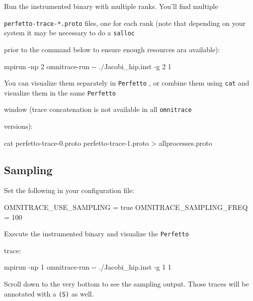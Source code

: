 \documentclass[
]{article}
\let\oldtexttt\texttt
\renewcommand{\texttt}[1]{
  \colorbox{Light}{\oldtexttt{#1}}
}
\newenvironment{Shaded}{}{}
\newcommand{\ExtensionTok}[1]{#1}
\newcommand{\FunctionTok}[1]{\textcolor[rgb]{0.02,0.16,0.49}{#1}}
\newcommand{\NormalTok}[1]{#1}
\newcommand{\OperatorTok}[1]{\textcolor[rgb]{0.40,0.40,0.40}{#1}}
\begin{document}
Run the instrumented binary with multiple ranks. You'll find multiple
\texttt{perfetto-trace-*.proto} files, one for each rank (note that
depending on your system it may be necessary to do a \texttt{salloc}
prior to the command below to ensure enough resources ara available):

\begin{Shaded}
\begin{Highlighting}[]
\ExtensionTok{mpirun}\NormalTok{ {-}np 2 omnitrace{-}run {-}{-} ./Jacobi\_hip.inst {-}g 2 1}
\end{Highlighting}
\end{Shaded}

You can visualize them separately in \texttt{Perfetto}, or combine them
using \texttt{cat} and visualize them in the same \texttt{Perfetto}
window (trace concatenation is not available in all \texttt{omnitrace}
versions):

\begin{Shaded}
\begin{Highlighting}[]
\FunctionTok{cat}\NormalTok{ perfetto{-}trace{-}0.proto perfetto{-}trace{-}1.proto }\OperatorTok{\textgreater{}}\NormalTok{ allprocesses.proto}
\end{Highlighting}
\end{Shaded}

\hypertarget{sampling}{%
\subsection{Sampling}\label{sampling}}

Set the following in your configuration file:

\begin{Shaded}
\begin{Highlighting}[]
\ExtensionTok{OMNITRACE\_USE\_SAMPLING}\NormalTok{ = true}
\ExtensionTok{OMNITRACE\_SAMPLING\_FREQ}\NormalTok{ = 100}
\end{Highlighting}
\end{Shaded}

Execute the instrumented binary and visualize the \texttt{Perfetto}
trace:

\begin{Shaded}
\begin{Highlighting}[]
\ExtensionTok{mpirun}\NormalTok{ {-}np 1 omnitrace{-}run {-}{-} ./Jacobi\_hip.inst {-}g 1 1}
\end{Highlighting}
\end{Shaded}

Scroll down to the very bottom to see the sampling output. Those traces
will be annotated with a \texttt{(S)} as well.
\end{document}
